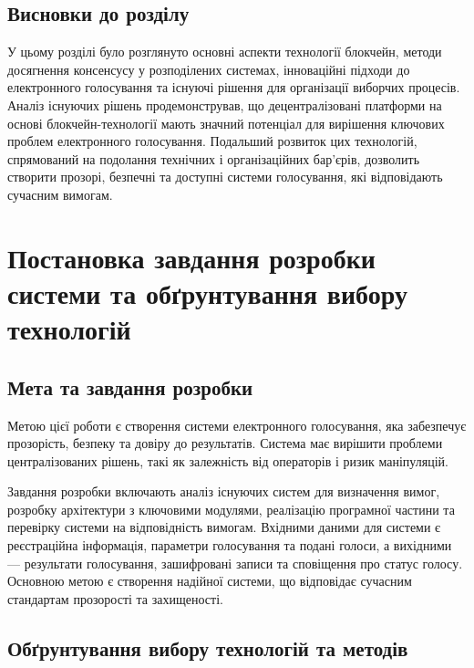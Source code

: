 \documentclass[14pt]{extreport}
\begin{document}
  \section{Висновки до розділу}
  
  У цьому розділі було розглянуто основні аспекти технології блокчейн, методи досягнення консенсусу у розподілених системах, інноваційні підходи до електронного голосування та існуючі рішення для організації виборчих процесів. Аналіз існуючих рішень продемонстрував, що децентралізовані платформи на основі блокчейн-технології мають значний потенціал для вирішення ключових проблем електронного голосування. Подальший розвиток цих технологій, спрямований на подолання технічних і організаційних бар'єрів, дозволить створити прозорі, безпечні та доступні системи голосування, які відповідають сучасним вимогам.
  
  \chapter{Постановка завдання розробки системи та обґрунтування вибору технологій}

  \section{Мета та завдання розробки}
  
  Метою цієї роботи є створення системи електронного голосування, яка забезпечує прозорість, безпеку та довіру до результатів. Система має вирішити проблеми централізованих рішень, такі як залежність від операторів і ризик маніпуляцій.

  Завдання розробки включають аналіз існуючих систем для визначення вимог, розробку архітектури з ключовими модулями, реалізацію програмної частини та перевірку системи на відповідність вимогам. Вхідними даними для системи є реєстраційна інформація, параметри голосування та подані голоси, а вихідними — результати голосування, зашифровані записи та сповіщення про статус голосу. Основною метою є створення надійної системи, що відповідає сучасним стандартам прозорості та захищеності.
  
  \section{Обґрунтування вибору технологій та методів}
  
\end{document}
